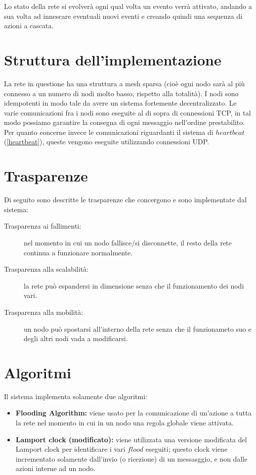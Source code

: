 \documentclass{memoir}
\begin{document}
Lo stato della rete si evolverà ogni qual volta un evento verrà attivato, andando
	   a sua volta ad innescare eventuali nuovi eventi e creando quindi una sequenza
	   di
	   azioni a cascata.

\section{Struttura dell'implementazione}

La rete in questione ha una struttura a mesh sparsa (cioè ogni nodo sarà al più
	   connesso a un numero di nodi molto basso, rispetto alla totalità).
I nodi sono idempotenti in modo tale da avere un sistema fortemente decentralizzato.
Le varie comunicazioni fra i nodi sono eseguite al di sopra di connessioni TCP, in
	   tal modo possiamo garantire la consegna di ogni messaggio nell'ordine prestabilito.
Per quanto concerne invece le comunicazioni riguardanti il sistema di $heartbeat$
	   (\ref{heartbeat}), queste vengono eseguite utilizzando connessioni UDP.

\section{Trasparenze}\label{Trasparenze}

Di seguito sono descritte le trasparenze che concergono e sono implementate dal sistema:

\begin{description} 
\item[Trasparenza ai fallimenti:] nel momento in cui un nodo fallisce/si disconnette,
	   il resto della rete continua a funzionare normalmente.
\item[Trasparenza alla scalabilità:] la rete può espandersi in dimensione senza
	   che il funzionamento dei nodi vari.
\item[Trasparenza alla mobilità:] un nodo può spostarsi all'interno della rete
	   senza che il funzionameto suo e degli altri nodi vada a modificarsi.
\end{description}

\section{Algoritmi}

Il sistema implementa solamente due algoritmi:
\begin{itemize}
\item \textbf{Flooding Algorithm:} viene usato per la comunicazione di un'azione
	   a tutta la rete nel momento in cui in un nodo una regola globale viene attivata.
\item \textbf{Lamport clock (modificato):} viene utilizzata una versione modificata
	   del Lamport clock per identificare i vari $flood$ eseguiti; questo clock viene
	   incrementato
	   solamente dall'invio (o ricezione) di un messasggio, e non dalle azioni interne
	   ad
	   un nodo.
\end{itemize}
\end{document}

